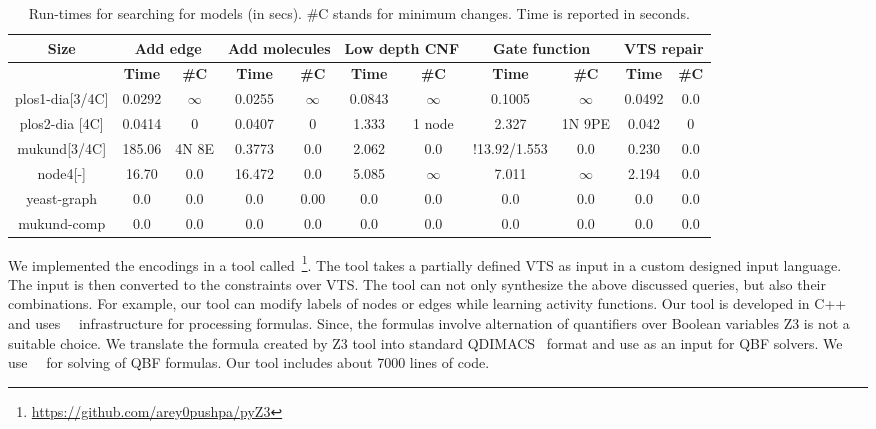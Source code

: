 \begin{table}[t]
  \centering
  \begin{tabular}[t]{|c@{}|@{}c@{}|@{}c@{}|@{}c@{}|@{}c@{}|@{}c@{}|@{}c@{}|@{}c@{}|@{}c@{}|@{}c@{}|@{}c@{}}\hline
    {\multirow{2}{*} \textbf{Size}}  & \multicolumn{2}{c|}{\textbf{Add edge}} & \multicolumn{2}{c|}{\textbf{Add molecules}} & \multicolumn{2}{c|}{\textbf{Low depth CNF}}  &  \multicolumn{2}{c|}{\textbf{Gate function}} &  \multicolumn{2}{c|}{\textbf{VTS repair}} \\\hline
   
   \cline{2-9}
    {} & {\textbf{Time}} & {\textbf{\#C}} & {\textbf{Time}} & {\textbf{\#C}} & {\textbf{Time}} & {\textbf{\#C}} & {\textbf{Time}} & {\textbf{\#C}} & {\textbf{Time}} & {\textbf{\#C}} \\\hline
    
    plos1-dia[3/4C] & 0.0292 & $\infty$ & 0.0255 & $\infty$ & 0.0843 & $\infty$ & 0.1005 & $\infty$ & 0.0492 & 0.0\\\hline
    plos2-dia [4C] & 0.0414 & 0 & 0.0407 & 0 & 1.333 & 1 node & 2.327 & 1N 9PE & 0.042 & 0 \\\hline
    mukund[3/4C] & 185.06 & 4N 8E & 0.3773 & 0.0 & 2.062 & 0.0 & !13.92/1.553 & 0.0 & 0.230 & 0.0 \\\hline
    node4[-] & 16.70 & 0.0 & 16.472 & 0.0 &  5.085 & $\infty$ & 7.011 & $\infty$ & 2.194 & 0.0\\\hline
    yeast-graph & 0.0 & 0.0 & 0.0 & 0.00 & 0.0 & 0.0 & 0.0  & 0.0 & 0.0 & 0.0 \\\hline
    mukund-comp & 0.0 & 0.0 & 0.0 & 0.0 & 0.0 & 0.0 & 0.0 & 0.0 & 0.0 & 0.0\\\hline
  \end{tabular}
  \caption{Run-times for searching for models (in secs). \#C  stands for minimum changes.
  Time is reported in seconds.}
  \label{tab:qf-graph}
\end{table}


We implemented the encodings in a tool
called~\ourtool\footnote{{\url{https://github.com/arey0pushpa/pyZ3}}}.
%
The tool takes a partially defined VTS as input in a custom designed
input language.
%
The input is then converted to the constraints over VTS. 
%
The tool can not only synthesize the above discussed queries, but also their
combinations.
%
For example, our tool can modify labels of nodes or edges while
learning activity functions.
%
Our tool is developed in C++ and uses~\zthree~\cite{z3} infrastructure for
processing formulas. 
%
Since, the formulas involve alternation of quantifiers over Boolean
variables Z3 is not a suitable choice.
%
We translate the formula created by Z3 tool into standard
QDIMACS~\cite{qdimacs} format and use as an input for QBF solvers. 
%
We use~\depqbf~\cite{lonsing2010depqbf} for solving of QBF formulas. 
%
Our tool includes about 7000 lines of code.

